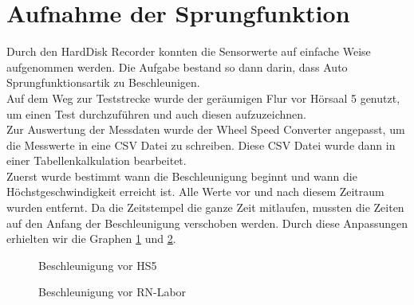 \documentclass[a4paper,12pt]{report}
\begin{document}
	\section{Aufnahme der Sprungfunktion}
	Durch den HardDisk Recorder konnten die Sensorwerte auf einfache Weise aufgenommen werden. Die Aufgabe bestand so dann darin, dass Auto Sprungfunktionsartik zu Beschleunigen. \\
	Auf dem Weg zur Teststrecke wurde der geräumigen Flur vor Hörsaal 5 genutzt, um einen Test durchzuführen und auch diesen aufzuzeichnen. \\
	Zur Auswertung der Messdaten wurde der Wheel Speed Converter angepasst, um die Messwerte in eine CSV Datei zu schreiben. Diese CSV Datei wurde dann in einer Tabellenkalkulation bearbeitet. \\
	Zuerst wurde bestimmt wann die Beschleunigung beginnt und wann die Höchstgeschwindigkeit erreicht ist. Alle Werte vor und nach diesem Zeitraum wurden entfernt. Da die Zeitstempel die ganze Zeit mitlaufen, mussten die Zeiten auf den Anfang der Beschleunigung verschoben werden. Durch diese Anpassungen erhielten wir die Graphen \ref{img-accelleration1} und \ref{img-accelleration2}.\\
	\begin{figure}[ht]
		\centering
		
		\caption{Beschleunigung vor HS5}
		\label{img-accelleration1}
	\end{figure}

	\begin{figure}[ht]
		\centering
		
		\caption{Beschleunigung vor RN-Labor}
		\label{img-accelleration2}
	\end{figure}
	
\end{document}
